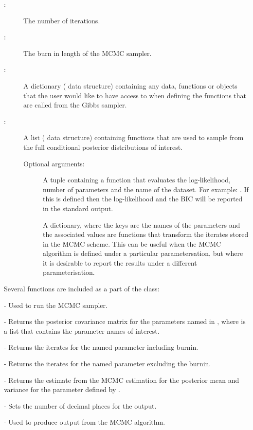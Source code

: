 \documentclass[article]{jss}
\begin{document}
\begin{description}
\item[:]  The number of iterations. 
\item[:]  The burn in length of the MCMC sampler. 
\item[:] A dictionary ( data structure)
  containing any data, functions or objects that the user would like
  to have access to when defining the functions that are called from
  the Gibbs sampler.
\item[:] A list ( data structure)
  containing functions that are used to sample from the full
  conditional posterior distributions of interest.
\item[] Optional arguments:
  
  \begin{description}
  \item[] A tuple containing a function that evaluates
    the log-likelihood, number of parameters and the name of the
    dataset. For example: .
    If this is defined then the log-likelihood and the BIC will be
    reported in the standard output.
  \item[] A dictionary, where the keys are the names
    of the parameters and the associated values are functions that
    transform the iterates stored in the MCMC scheme. This can be
    useful when the MCMC algorithm is defined under a particular
    parametersation, but where it is desirable to report the results
    under a different parameterisation.
\end{description}
\end{description}
Several functions are included as a part of the class:
\begin{description}
\item {} - Used to run the MCMC sampler. 
\item {} - Returns the posterior
  covariance matrix for the parameters named in , where
   is a list that contains the parameter names of
  interest.
\item {} - Returns the iterates for the named
  parameter including burnin.
\item {} - Returns the iterates for
  the named parameter excluding the burnin.
\item {} - Returns the estimate from the MCMC
  estimation for the posterior mean and variance for the parameter
  defined by .
\item {} - Sets the number of decimal
  places for the output.
\item {} - Used to produce output from the
  MCMC algorithm.
\end{description}
\end{document}
